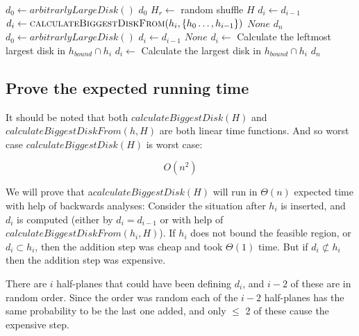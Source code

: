 \documentclass{article}
\begin{document}
\begin{algorithmic}[1]
		\State
		$d_0 \gets arbitrarlyLargeDisk()$
			\State
			\Return $d_0$
		\EndIf
		\State
		$H_r \gets$ random shuffle $H$
			\State
			$d_i \gets d_{i-1}$
			\State
			$d_i \gets \Call{calculateBiggestDiskFrom}{h_i, \{h_0\dots,h_{i-1}\}}$
				\State
				\Return $None$
			\EndIf
			\EndIf
		\EndFor
		\State
		\Return $d_n$
	\EndFunction
		\State
		$d_0 \gets arbitrarlyLargeDisk()$
			\State
			$d_i \gets d_{i-1}$
					\State
					\Return $None$
				\EndIf
				\State
				$d_i \gets$ Calculate the leftmost largest disk in $h_{bound} \cap h_{i}$
				\Else
				\State
				$d_i \gets$ Calculate the largest disk in $h_{bound} \cap h_{i}$
				\EndIf
				\State
			\EndIf
			\EndIf
		\EndFor
		\State
		\Return $d_n$
	\EndFunction
\end{algorithmic}

\subsection{Prove the expected running time}
It should be noted that both $calculateBiggestDisk(H)$ and
$calculateBiggestDiskFrom(h,H)$ are both linear time functions.
And so worst case $calculateBiggestDisk(H)$ is worst case:

\[O(n^2)\]

We will prove that a$calculateBiggestDisk(H)$ will run in $\Theta(n)$ expected
time with help of backwards analyses: Consider the situation after $h_i$ is
inserted, and $d_i$ is computed (either by $d_i = d_{i-1}$ or with help
of $calculateBiggestDiskFrom(h_i,H)$). If $h_i$ does not bound the feasible
region, or $d_i \subset h_i$, then the addition step was cheap
and took $\Theta(1)$ time. But if $d_i \not\subset h_i$ then the addition
step was expensive.

There are $i$ half-planes that could have been defining $d_i$, and $i-2$
of these are in random order. Since the order was random each of the $i-2$
half-planes has the same probability to be the last one added, and only
$\leq$ 2 of these cause the expensive step.
\end{document}
